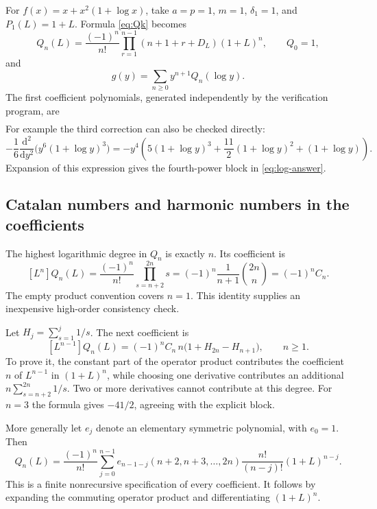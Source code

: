 \documentclass[11pt,a4paper]{article}
\theoremstyle{definition}
\theoremstyle{remark}
\newcommand{\dd}{\mathrm d}
\begin{document}
For $f(x)=x+x^2(1+\log x)$, take $a=p=1$, $m=1$, $\delta_1=1$, and
$P_1(L)=1+L$. Formula \eqref{eq:Qk} becomes
\begin{equation}\label{eq:logQ}
 Q_n(L)=\frac{(-1)^n}{n!}
       \prod_{r=1}^{n-1}(n+1+r+D_L)(1+L)^n,
 \qquad Q_0=1,
\end{equation}
and
\begin{equation}\label{eq:logseries}
 g(y)=\sum_{n\ge0}y^{n+1}Q_n(\log y).
\end{equation}
The first coefficient polynomials, generated independently by the verification
program, are
\begin{align}

\end{align}
For example the third correction can also be checked directly:
\[
 -\frac16\frac{\dd^2}{\dd y^2}\bigl(y^6(1+\log y)^3\bigr)
 =-y^4\left(5(1+\log y)^3+\frac{11}{2}(1+\log y)^2
                                      +(1+\log y)\right).
\]
Expansion of this expression gives the fourth-power block in
\eqref{eq:log-answer}.

\subsection{Catalan numbers and harmonic numbers in the coefficients}

The highest logarithmic degree in $Q_n$ is exactly $n$. Its coefficient is
\begin{equation}\label{eq:Catalan}
 [L^n]Q_n(L)=\frac{(-1)^n}{n!}\prod_{s=n+2}^{2n}s
            =(-1)^n\frac{1}{n+1}\binom{2n}{n}
            =(-1)^n C_n.
\end{equation}
The empty product convention covers $n=1$. This identity supplies an
inexpensive high-order consistency check.

Let $H_j=\sum_{s=1}^j1/s$. The next coefficient is
\begin{equation}\label{eq:harmonic}
 [L^{n-1}]Q_n(L)=(-1)^n C_n\,n\bigl(1+H_{2n}-H_{n+1}\bigr),\qquad n\ge1.
\end{equation}
To prove it, the constant part of the operator product contributes the
coefficient $n$ of $L^{n-1}$ in $(1+L)^n$, while choosing one derivative
contributes an additional
$n\sum_{s=n+2}^{2n}1/s$. Two or more derivatives cannot contribute at this
degree. For $n=3$ the formula gives $-41/2$, agreeing with the explicit block.

More generally let $e_j$ denote an elementary symmetric polynomial, with
$e_0=1$. Then
\begin{equation}\label{eq:symmetric-Q}
 Q_n(L)=\frac{(-1)^n}{n!}
 \sum_{j=0}^{n-1}e_{n-1-j}(n+2,n+3,\ldots,2n)
       \frac{n!}{(n-j)!}(1+L)^{n-j}.
\end{equation}
This is a finite nonrecursive specification of every coefficient. It follows
by expanding the commuting operator product and differentiating $(1+L)^n$.
\end{document}

